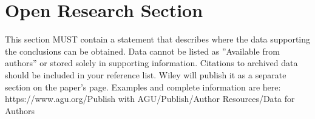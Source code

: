\documentclass[draft]{agujournal2019}
\begin{document}
%
%

\section*{Open Research Section}
This section MUST contain a statement that describes where the data supporting the conclusions can be obtained. Data cannot be listed as ''Available from authors'' or stored solely in supporting information. Citations to archived data should be included in your reference list. Wiley will publish it as a separate section on the paper’s page. Examples and complete information are here:
https://www.agu.org/Publish with AGU/Publish/Author Resources/Data for Authors

\end{document}
